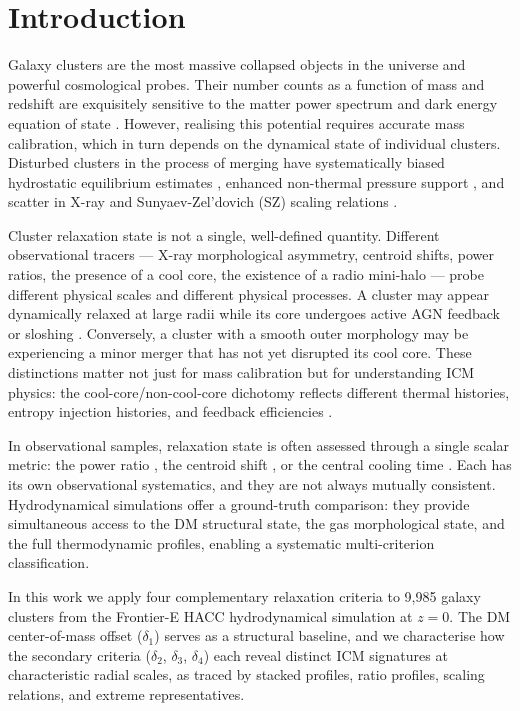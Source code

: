 \documentclass[12pt]{article}
\newcommand{\deltai}{\delta_1}
\newcommand{\deltaii}{\delta_2}
\newcommand{\deltaiii}{\delta_3}
\newcommand{\deltaiv}{\delta_4}
\begin{document}
\section{Introduction}
\label{sec:intro}

Galaxy clusters are the most massive collapsed objects in the universe and powerful
cosmological probes.  Their number counts as a function of mass and redshift are
exquisitely sensitive to the matter power spectrum and dark energy equation of state
\citep{mantz2015}.  However, realising this potential requires accurate mass calibration,
which in turn depends on the dynamical state of individual clusters.
Disturbed clusters in the process of merging have systematically biased hydrostatic
equilibrium estimates \citep{biffi2016,rasia2013}, enhanced non-thermal pressure support
\citep{nagai2007}, and scatter in X-ray and Sunyaev-Zel'dovich (SZ) scaling relations
\citep{kravtsov2006}.

Cluster relaxation state is not a single, well-defined quantity.  Different observational
tracers --- X-ray morphological asymmetry, centroid shifts, power ratios, the presence
of a cool core, the existence of a radio mini-halo --- probe different physical scales
and different physical processes.  A cluster may appear dynamically relaxed at large
radii while its core undergoes active AGN feedback or sloshing \citep{markevitch2007,
zuhone2010}.  Conversely, a cluster with a smooth outer morphology may be experiencing
a minor merger that has not yet disrupted its cool core.
These distinctions matter not just for mass calibration but for understanding ICM physics:
the cool-core/non-cool-core dichotomy reflects different thermal histories, entropy
injection histories, and feedback efficiencies \citep{burns2008,gitti2012}.

In observational samples, relaxation state is often assessed through a single scalar
metric: the power ratio \citep{poole2007}, the centroid shift \citep{cassano2010},
or the central cooling time \citep{hudson2010}.  Each has its own observational
systematics, and they are not always mutually consistent.  Hydrodynamical simulations
offer a ground-truth comparison: they provide simultaneous access to the DM structural
state, the gas morphological state, and the full thermodynamic profiles, enabling a
systematic multi-criterion classification.

In this work we apply four complementary relaxation criteria to 9{,}985 galaxy clusters
from the Frontier-E HACC hydrodynamical simulation \citep{hacc2016} at $z = 0$.
The DM center-of-mass offset ($\deltai$) serves as a structural baseline, and we
characterise how the secondary criteria ($\deltaii$, $\deltaiii$, $\deltaiv$) each
reveal distinct ICM signatures at characteristic radial scales, as traced by stacked
profiles, ratio profiles, scaling relations, and extreme representatives.
\end{document}
